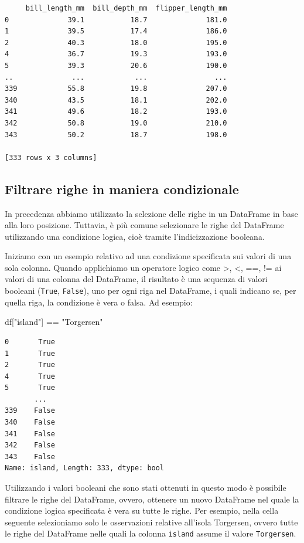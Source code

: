 \documentclass[
  letterpaper,
  krantz2]{{[}./krantz{]}}
\newenvironment{Shaded}{\begin{snugshade}}{\end{snugshade}}
\newcommand{\NormalTok}[1]{\textcolor[rgb]{0.00,0.23,0.31}{#1}}
\newcommand{\OperatorTok}[1]{\textcolor[rgb]{0.37,0.37,0.37}{#1}}
\newcommand{\StringTok}[1]{\textcolor[rgb]{0.13,0.47,0.30}{#1}}
\begin{document}
\begin{verbatim}
     bill_length_mm  bill_depth_mm  flipper_length_mm
0              39.1           18.7              181.0
1              39.5           17.4              186.0
2              40.3           18.0              195.0
4              36.7           19.3              193.0
5              39.3           20.6              190.0
..              ...            ...                ...
339            55.8           19.8              207.0
340            43.5           18.1              202.0
341            49.6           18.2              193.0
342            50.8           19.0              210.0
343            50.2           18.7              198.0

[333 rows x 3 columns]
\end{verbatim}

\subsection{Filtrare righe in maniera
condizionale}\label{filtrare-righe-in-maniera-condizionale}

In precedenza abbiamo utilizzato la selezione delle righe in un
DataFrame in base alla loro posizione. Tuttavia, è più comune
selezionare le righe del DataFrame utilizzando una condizione logica,
cioè tramite l'indicizzazione booleana.

Iniziamo con un esempio relativo ad una condizione specificata sui
valori di una sola colonna. Quando applichiamo un operatore logico come
\textgreater, \textless, ==, != ai valori di una colonna del DataFrame,
il risultato è una sequenza di valori booleani (\texttt{True},
\texttt{False}), uno per ogni riga nel DataFrame, i quali indicano se,
per quella riga, la condizione è vera o falsa. Ad esempio:

\begin{Shaded}
\begin{Highlighting}[]
\NormalTok{df[}\StringTok{"island"}\NormalTok{] }\OperatorTok{==} \StringTok{"Torgersen"}
\end{Highlighting}
\end{Shaded}

\begin{verbatim}
0       True
1       True
2       True
4       True
5       True
       ...  
339    False
340    False
341    False
342    False
343    False
Name: island, Length: 333, dtype: bool
\end{verbatim}

Utilizzando i valori booleani che sono stati ottenuti in questo modo è
possibile filtrare le righe del DataFrame, ovvero, ottenere un nuovo
DataFrame nel quale la condizione logica specificata è vera su tutte le
righe. Per esempio, nella cella seguente selezioniamo solo le
osservazioni relative all'isola Torgersen, ovvero tutte le righe del
DataFrame nelle quali la colonna \texttt{island} assume il valore
\texttt{Torgersen}.
\end{document}
